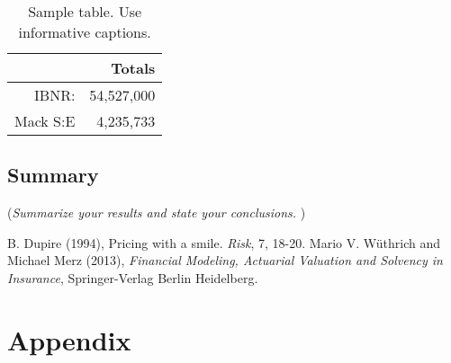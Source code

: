 \documentclass[11pt]{article}
\begin{document}
\begin{table}[!ht]
\center
\begin{tabular}{rr}
	& Totals \\ 
\hline
IBNR: & 54,527,000 \\
Mack S:E & 4,235,733\\
\hline
\end{tabular}
\caption{Sample table. Use informative captions.} \label{tab:sampletab}
\end{table}



\subsection*{Summary}
({\it Summarize your results and state your conclusions. })



\begin{thebibliography}{99}
B. Dupire (1994),
Pricing with a smile.
\emph{Risk}, 7, 18-20.
  Mario V. W\"{u}thrich and Michael Merz (2013),
  \emph{Financial Modeling, Actuarial Valuation and Solvency in Insurance},
  Springer-Verlag Berlin Heidelberg.
\end{thebibliography}


\section*{Appendix}
\end{document}
